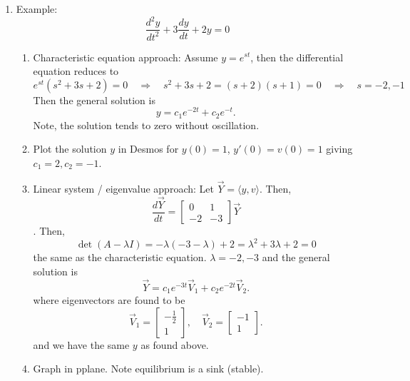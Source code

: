 \documentclass{article}
\begin{document}
\begin{enumerate}
\item Example:
\[
\frac{d^2 y}{dt^2} + 3\frac{dy}{dt} + 2y = 0
\]
\begin{enumerate}
\item Characteristic equation approach: Assume $y = e^{st}$, then the differential equation reduces to
\[
e^{st}(s^2+3s+2)=0 \quad \Rightarrow \quad s^2+3s+2=(s+2)(s+1)=0 \quad \Rightarrow \quad s=-2, -1
\]
Then the general solution is
\[
y = c_1 e^{-2t} + c_2 e^{-t}. 
\]
Note, the solution tends to zero without oscillation.
\item Plot the solution $y$ in Desmos for $y(0)=1$, $y'(0)=v(0)=1$ giving $c_1=2, c_2=-1$.
\item Linear system / eigenvalue approach: Let $\vec{Y} = \langle y, v \rangle$. Then,
\[
\frac{d \vec{Y}}{dt} = \begin{bmatrix}
0 & 1 \\
-2 & -3
\end{bmatrix} \vec{Y}
\].
Then,
\[
\det(A-\lambda I) = -\lambda(-3-\lambda)+2 = \lambda^2+3\lambda+2=0
\]
the same as the characteristic equation. $\lambda = -2,-3$ and the general solution is
\[
\vec{Y} = c_1 e^{-3t} \vec{V}_1+ c_2 e^{-2t} \vec{V}_2.
\]
where eigenvectors are found to be
\[
\vec{V}_1 = 
\begin{bmatrix}
-\frac{1}{2} \\1
\end{bmatrix}, \quad
\vec{V}_2 = 
\begin{bmatrix}
-1 \\1
\end{bmatrix}.
\] and we have the same $y$ as found above.
\item Graph in pplane. Note equilibrium is a sink (stable).
\end{enumerate}



\end{enumerate}
\end{document}
